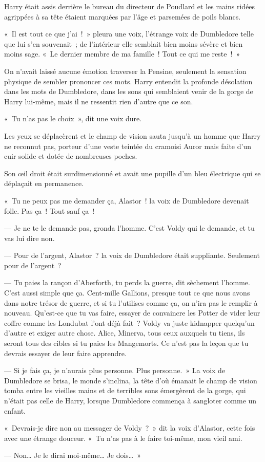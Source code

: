 \begin{em}
Harry était assis derrière le bureau du directeur de Poudlard et les mains ridées agrippées à sa tête étaient marquées par l'âge et parsemées de poils blancs.

«~Il est tout ce que j'ai~!~» pleura une voix, l'étrange voix de Dumbledore telle que lui s'en souvenait~; de l'intérieur elle semblait bien moins sévère et bien moins sage. «~Le dernier membre de ma famille~! Tout ce qui me reste~!~»

On n'avait laissé aucune émotion traverser la Pensine, seulement la sensation physique de sembler prononcer ces mots. Harry entendit la profonde désolation dans les mots de Dumbledore, dans les sons qui semblaient venir de la gorge de Harry lui-même, mais il ne ressentit rien d'autre que ce son.

«~Tu n'as pas le choix~», dit une voix dure.

Les yeux se déplacèrent et le champ de vision sauta jusqu'à un homme que Harry ne reconnut pas, porteur d'une veste teintée du cramoisi Auror mais faite d'un cuir solide et dotée de nombreuses poches.

Son œil droit était surdimensionné et avait une pupille d'un bleu électrique qui se déplaçait en permanence.

«~Tu ne peux pas me demander ça, Alastor~! la voix de Dumbledore devenait folle. Pas ça~! Tout sauf ça~!

--- Je ne te le demande pas, gronda l'homme. C'est Voldy qui le demande, et tu vas lui dire non.

--- Pour de l'argent, Alastor~? la voix de Dumbledore était suppliante. Seulement pour de l'argent~?

--- Tu paies la rançon d'Aberforth, tu perds la guerre, dit sèchement l'homme. C'est aussi simple que ça. Cent-mille Gallions, presque tout ce que nous avons dans notre trésor de guerre, et si tu l'utilises comme ça, on n'ira pas le remplir à nouveau. Qu'est-ce que tu vas faire, essayer de convaincre les Potter de vider leur coffre comme les Londubat l'ont déjà fait~? Voldy va juste kidnapper quelqu'un d'autre et exiger autre chose. Alice, Minerva, tous ceux auxquels tu tiens, ils seront tous des cibles si tu paies les Mangemorts. Ce n'est pas la leçon que tu devrais essayer de leur faire apprendre.

--- Si je fais ça, je n'aurais plus personne. Plus personne.~» La voix de Dumbledore se brisa, le monde s'inclina, la tête d'où émanait le champ de vision tomba entre les vieilles mains et de terribles sons émergèrent de la gorge, qui n'était pas celle de Harry, lorsque Dumbledore commença à sangloter comme un enfant.

«~Devrais-je dire non au messager de Voldy~?~» dit la voix d'Alastor, cette fois avec une étrange douceur. «~Tu n'as pas à le faire toi-même, mon vieil ami.

--- Non… Je le dirai moi-même… Je dois…~»
\end{em}

